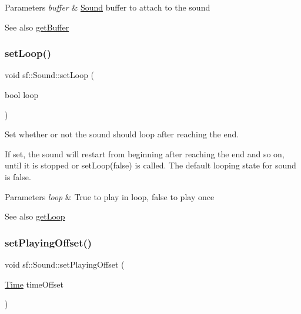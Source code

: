 \begin{DoxyParams}{Parameters}
{\em buffer} & \mbox{\hyperlink{classsf_1_1_sound}{Sound}} buffer to attach to the sound\\
\hline
\end{DoxyParams}
\begin{DoxySeeAlso}{See also}
\mbox{\hyperlink{classsf_1_1_sound_ab873727ae652c96b5a9437d7f8d8a44d}{get\+Buffer}} \begin{DoxyVerb}\end{DoxyVerb}
 
\end{DoxySeeAlso}
\mbox{\label{classsf_1_1_sound_af23ab4f78f975bbabac031102321612b}} 
\subsubsection{\texorpdfstring{setLoop()}{setLoop()}}
{\footnotesize\ttfamily void sf\+::\+Sound\+::set\+Loop (\begin{DoxyParamCaption}\item[{bool}]{loop }\end{DoxyParamCaption})}



Set whether or not the sound should loop after reaching the end. 

If set, the sound will restart from beginning after reaching the end and so on, until it is stopped or set\+Loop(false) is called. The default looping state for sound is false.


\begin{DoxyParams}{Parameters}
{\em loop} & True to play in loop, false to play once\\
\hline
\end{DoxyParams}
\begin{DoxySeeAlso}{See also}
\mbox{\hyperlink{classsf_1_1_sound_a054da07266ce8f39229495146e3041eb}{get\+Loop}} \begin{DoxyVerb}\end{DoxyVerb}
 
\end{DoxySeeAlso}
\mbox{\label{classsf_1_1_sound_ab905677846558042022dd6ab15cddff0}} 
\subsubsection{\texorpdfstring{setPlayingOffset()}{setPlayingOffset()}}
{\footnotesize\ttfamily void sf\+::\+Sound\+::set\+Playing\+Offset (\begin{DoxyParamCaption}\item[{\mbox{\hyperlink{classsf_1_1_time}{Time}}}]{time\+Offset }\end{DoxyParamCaption})}



